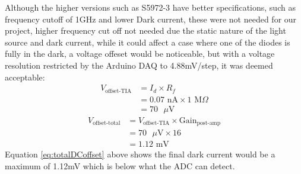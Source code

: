 Although the higher versions such as S5972-3 have better specifications, such as frequency cutoff of 1GHz and lower Dark current, these were not needed for our project, higher frequency cut off not needed due the static nature of the light source and dark current, while it could affect a case where one of the diodes is fully in the dark, a voltage offeset would be noticeable, but with a voltage resolution restricted by the Arduino DAQ to 4.88mV/step, it was deemed acceptable:
\begin{equation} \label{eq:darkCurrentOffset}
  \begin{split}
V_\text{offset-TIA} &= I_d \times R_f \\
&= 0.07 \text{ nA} \times 1 \text{ M}\Omega \\
&= 70 \text{ }\mu\text{V}
  \end{split}
\end{equation}
\begin{equation} \label{eq:totalDCoffset}
  \begin{split}
V_\text{offset-total} &= V_\text{offset-TIA} \times \text{Gain}_\text{post-amp} \\
&= 70 \text{ }\mu\text{V} \times 16 \\
&= 1.12 \text{ mV}
  \end{split}
\end{equation}
Equation \ref{eq:totalDCoffset} above shows the final dark current would be a maximum of 1.12mV which is below what the ADC can detect. 

